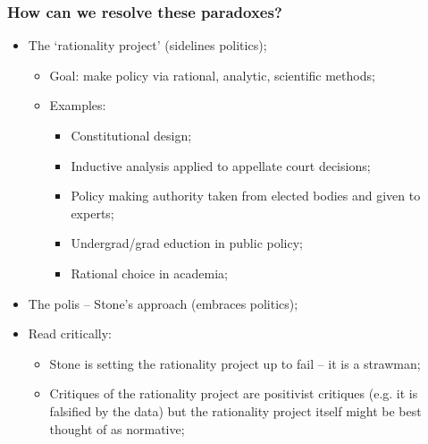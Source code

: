 \documentclass[aspectratio=169]{beamer}
\theoremstyle{principle}
\begin{document}
\begin{frame}
\frametitle{How can we resolve these paradoxes?}

\begin{itemize}
\item The `rationality project' (sidelines politics);
\bigskip
\begin{itemize}
\item Goal: make policy via rational, analytic, scientific methods;
\bigskip
\item Examples:
\begin{itemize}
\item Constitutional design;
\item Inductive analysis applied to appellate court decisions;
\item Policy making authority taken from elected bodies and given to experts;
\item Undergrad/grad eduction in public policy;
\item Rational choice in academia;
\end{itemize}
\end{itemize}
\bigskip
\bigskip
\item The polis -- Stone's approach (embraces politics);
\bigskip
\bigskip
\item Read critically:
\begin{itemize}
\item Stone is setting the rationality project up to fail -- it is a strawman;
\item Critiques of the rationality project are positivist critiques (e.g. it is falsified by the data) but the rationality project itself might be best thought of as normative;
\end{itemize}

\end{itemize} 

\end{frame}
\end{document}
